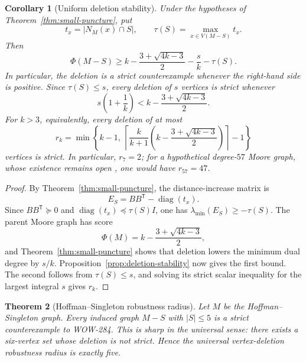 \documentclass[a4paper,10pt,reqno]{amsart}
\theoremstyle{plain}
\newtheorem{theorem}{Theorem}[section]
\newtheorem{corollary}[theorem]{Corollary}
\theoremstyle{definition}
\theoremstyle{remark}
\newcommand{\resultbox}[1]{\boxed{#1}}
\begin{document}
\begin{corollary}[Uniform deletion stability]
\label{cor:uniform-deletion}
Under the hypotheses of Theorem~\ref{thm:small-puncture}, put
\[
 t_x=|N_M(x)\cap S|,
 \qquad
 \tau(S)=\max_{x\in V(M-S)}t_x.
\]
Then
\[
 \resultbox{
 \Phi(M-S)\ge
 k-\frac{3+\sqrt{4k-3}}2-\frac{s}{k}-\tau(S).
 }
\]
In particular, the deletion is a strict counterexample whenever the
right-hand side is positive.  Since \(\tau(S)\le s\), every deletion of
\(s\) vertices is strict whenever
\[
 \resultbox{
 s\left(1+\frac1k\right)
 <k-\frac{3+\sqrt{4k-3}}2.
 }
\]
For \(k>3\), equivalently, every deletion of at most
\[
 r_k=\min\left\{
 k-1,\
 \left\lceil
 \frac{k}{k+1}\left(k-\frac{3+\sqrt{4k-3}}2\right)
 \right\rceil-1
 \right\}
\]
vertices is strict.  In particular, \(r_7=2\); for a hypothetical
degree-\(57\) Moore graph, whose existence remains open
\cite{SmithMontemanni2026}, one would have \(r_{57}=47\).
\end{corollary}

\begin{proof}
By Theorem~\ref{thm:small-puncture}, the distance-increase matrix is
\[
 E_S=BB^{\mathsf T}-\operatorname{diag}(t_x).
\]
Since \(BB^{\mathsf T}\succeq0\) and
\(\operatorname{diag}(t_x)\preceq\tau(S)I\), one has
\(\lambda_{\min}(E_S)\ge-\tau(S)\).  The parent Moore graph has score
\[
 \Phi(M)=k-\frac{3+\sqrt{4k-3}}2,
\]
and Theorem~\ref{thm:small-puncture} shows that deletion lowers the minimum
dual degree by \(s/k\).  Proposition~\ref{prop:deletion-stability} now gives
the first bound.  The second follows from \(\tau(S)\le s\), and solving its
strict scalar inequality for the largest integral \(s\) gives \(r_k\).
\end{proof}

\begin{theorem}[Hoffman--Singleton robustness radius]\label{thm:hs-radius}
Let \(M\) be the Hoffman--Singleton graph.  Every induced graph \(M-S\) with
\(|S|\le5\) is a strict counterexample to WOW-284.  This is sharp in the
universal sense: there exists a six-vertex set whose deletion is not strict.
Hence the universal vertex-deletion robustness radius is exactly five.
\end{theorem}
\end{document}
